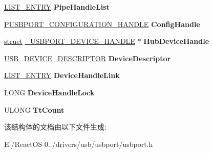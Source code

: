 \begin{DoxyCompactItemize}
\mbox{\label{struct___u_s_b_p_o_r_t___d_e_v_i_c_e___h_a_n_d_l_e_a710972a848e19c4e0fe99e95af0f1359}} 
\hyperlink{struct___l_i_s_t___e_n_t_r_y}{L\+I\+S\+T\+\_\+\+E\+N\+T\+RY} {\bfseries Pipe\+Handle\+List}
\item 
\mbox{\label{struct___u_s_b_p_o_r_t___d_e_v_i_c_e___h_a_n_d_l_e_ab871076cb7deb82d89031e82eadd9f70}} 
\hyperlink{struct___u_s_b_p_o_r_t___c_o_n_f_i_g_u_r_a_t_i_o_n___h_a_n_d_l_e}{P\+U\+S\+B\+P\+O\+R\+T\+\_\+\+C\+O\+N\+F\+I\+G\+U\+R\+A\+T\+I\+O\+N\+\_\+\+H\+A\+N\+D\+LE} {\bfseries Config\+Handle}
\item 
\mbox{\label{struct___u_s_b_p_o_r_t___d_e_v_i_c_e___h_a_n_d_l_e_ad902c38ab24082ea2872ddeb9105246c}} 
\hyperlink{interfacestruct}{struct} \hyperlink{struct___u_s_b_p_o_r_t___d_e_v_i_c_e___h_a_n_d_l_e}{\+\_\+\+U\+S\+B\+P\+O\+R\+T\+\_\+\+D\+E\+V\+I\+C\+E\+\_\+\+H\+A\+N\+D\+LE} $\ast$ {\bfseries Hub\+Device\+Handle}
\item 
\mbox{\label{struct___u_s_b_p_o_r_t___d_e_v_i_c_e___h_a_n_d_l_e_a5feac83ee45658272b35051d7785b197}} 
\hyperlink{struct___u_s_b___d_e_v_i_c_e___d_e_s_c_r_i_p_t_o_r}{U\+S\+B\+\_\+\+D\+E\+V\+I\+C\+E\+\_\+\+D\+E\+S\+C\+R\+I\+P\+T\+OR} {\bfseries Device\+Descriptor}
\item 
\mbox{\label{struct___u_s_b_p_o_r_t___d_e_v_i_c_e___h_a_n_d_l_e_a71d861eb3fc0ebe82dbc5c156be6371b}} 
\hyperlink{struct___l_i_s_t___e_n_t_r_y}{L\+I\+S\+T\+\_\+\+E\+N\+T\+RY} {\bfseries Device\+Handle\+Link}
\item 
\mbox{\label{struct___u_s_b_p_o_r_t___d_e_v_i_c_e___h_a_n_d_l_e_a030bb8519a5edeff6637cc988b5b9d5a}} 
L\+O\+NG {\bfseries Device\+Handle\+Lock}
\item 
\mbox{\label{struct___u_s_b_p_o_r_t___d_e_v_i_c_e___h_a_n_d_l_e_acb1eac6521ca8560b8ec94743d0782e4}} 
U\+L\+O\+NG {\bfseries Tt\+Count}
\end{DoxyCompactItemize}


该结构体的文档由以下文件生成\+:\begin{DoxyCompactItemize}
\item 
E\+:/\+React\+O\+S-\/0../drivers/usb/usbport/usbport.\+h\end{DoxyCompactItemize}
